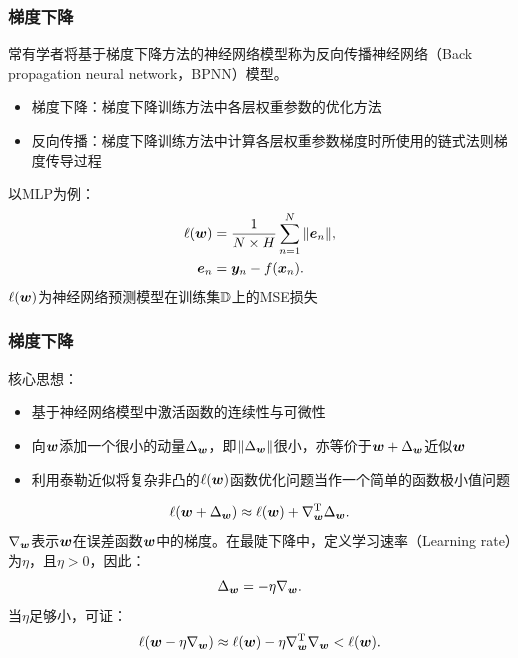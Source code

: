 \begin{frame}
    \frametitle{梯度下降}
    常有学者将基于梯度下降方法的神经网络模型称为反向传播神经网络（Back propagation neural network，BPNN）模型。

    \begin{itemize}
        \item 梯度下降：梯度下降训练方法中各层权重参数的优化方法
        \item 反向传播：梯度下降训练方法中计算各层权重参数梯度时所使用的链式法则梯度传导过程
    \end{itemize}

    以MLP为例：
    \begin{align*}
        \ell(\bm{w}) &= \frac{1}{N \times H} \sum^N_{n=1} \|\bm{e}_{n}\| ,\label{eq:ch.intro.mse}\\
        \bm{e}_{n} & = \bm{y}_n - f(\bm{x}_n).
    \end{align*}
    \centering
    \(\ell(\bm{w})\)为神经网络预测模型在训练集\(\mathbb{D}\)上的MSE损失

\end{frame}

\begin{frame}
    \frametitle{梯度下降}

    核心思想：
    \begin{itemize}
        \item 基于神经网络模型中激活函数的连续性与可微性
        \item 向\(\bm{w}\)添加一个很小的动量\(\Delta_{\bm{w}}\)，即\(\left \lVert \Delta_{\bm{w}} \right \rVert\)很小，亦等价于\(\bm{w} + \Delta_{\bm{w}}\)近似\(\bm{w}\)
        \item 利用泰勒近似将复杂非凸的\(\ell(\bm{w})\)函数优化问题当作一个简单的函数极小值问题
    \end{itemize}
    \begin{equation*}
        \ell({\bm{w} + \Delta_{\bm{w}}} ) \approx \ell({\bm{w}}) + \nabla_{\bm{w}}^{\mathrm{T}}\Delta_{\bm{w}}.
    \end{equation*}
    \(\nabla_{\bm{w}}\)表示\(\bm{w}\)在误差函数\(\bm{w}\)中的梯度。在最陡下降中，定义学习速率（Learning rate）为\(\eta \)，且\(\eta  > 0\)，因此：
    \begin{equation*}
        \Delta_{\bm{w}} = -\eta \nabla_{\bm{w}}. \label{eq:ch.intro.gd2}
    \end{equation*}
    当\(\eta \)足够小，可证：
    \begin{equation*}
        \ell({\bm{w} -\eta \nabla_{\bm{w}}} ) \approx \ell({\bm{w}})  -\eta  \nabla_{\bm{w}}^{\mathrm{T}} \nabla_{\bm{w}} < \ell({\bm{w}}). \label{eq:ch.intro.lr}
    \end{equation*}
\end{frame}


